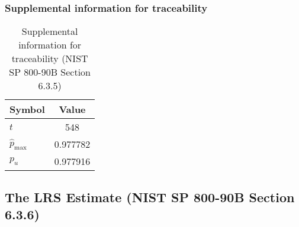 \documentclass[a3paper,xelatex,english]{bxjsarticle}
\begin{document}
\subsubsection{Supplemental information for traceability}
\renewcommand{\arraystretch}{1.8}
\begin{table}[h]
\caption{Supplemental information for traceability (NIST SP 800-90B Section 6.3.5)}
\begin{center}
\begin{tabular}{|l|c|}
\hline 
\rowcolor{anotherlightblue} %
Symbol				& Value \\ \hline 
$t$				&      548\\ \hline 
$\hat{p}_{\textrm{max}}$ 			& 0.977782\\ \hline
$p_u$				& 0.977916\\ \hline
\end{tabular}
\end{center}
\end{table}
\renewcommand{\arraystretch}{1.4}
\clearpage
\subsection{The LRS Estimate (NIST SP 800-90B Section 6.3.6)}\label{sec:Binary636}
\end{document}
